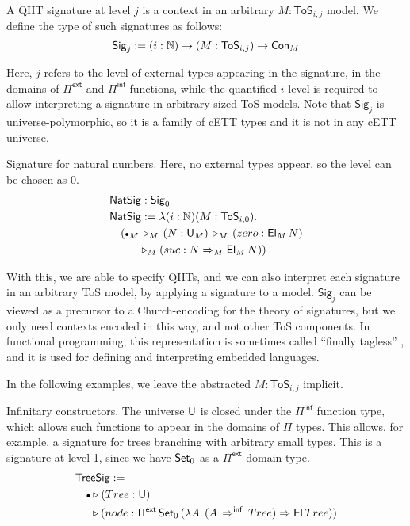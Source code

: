 \documentclass[sigplan,review,anonymous]{acmart}\settopmatter{printfolios=true,printccs=false,printacmref=false}
\newcommand{\ToS}{\mathsf{ToS}}
\newcommand{\ext}{\triangleright}
\newcommand{\emptycon}{\scaleobj{.75}\bullet}
\newcommand{\Pii}{\Pi}
\newcommand{\Pie}{\Pi^{\mathsf{ext}}}
\newcommand{\Piinf}{\Pi^{\mathsf{inf}}}
\newcommand{\Sig}{\mathsf{Sig}}
\newcommand{\NatSig}{\mathsf{NatSig}}
\newcommand{\arri}{\Rightarrow}
\newcommand{\arrinf}{\Rightarrow^{\mathsf{inf}}}
\begin{document}
\begin{definition}\label{def:signature}
A QIIT signature at level $j$ is a context in an arbitrary $M : \ToS_{i,j}$
model. We define the type of such signatures as follows:
\[
  \Sig_j := (i : \mathbb{N})\ra(M : \ToS_{i,j})\ra \Con_M
\]

Here, $j$ refers to the level of external types appearing in the signature, in
the domains of $\Pie$ and $\Piinf$ functions, while the quantified $i$ level is
required to allow interpreting a signature in arbitrary-sized ToS models. Note
that $\Sig_j$ is universe-polymorphic, so it is a family of cETT types and it is
not in any cETT universe.

\begin{example}{
    Signature for natural numbers. Here, no external types appear, so the level
    can be chosen as $0$.}
\begin{alignat*}{3}
  & \NatSig : \Sig_0 \\
  & \NatSig := \lambda (i :\mathbb{N})(M : \ToS_{i,0}).\\
  & \hspace{1em}(\emptycon_M\,\ext_M\, (N : \U_M) \,\ext_M\,(zero : \El_M\,N)\\
  & \hspace{2.67em}\ext_M (suc : N\arri_M\El_M\,N))
\end{alignat*}
\end{example}

With this, we are able to specify QIITs, and we can also interpret each
signature in an arbitrary ToS model, by applying a signature to a model.
$\Sig_j$ can be viewed as a precursor to a Church-encoding for the theory of
signatures, but we only need contexts encoded in this way, and not other ToS
components. In functional programming, this representation is sometimes called
``finally tagless'' \cite{carette2007finally}, and it is used for defining and
interpreting embedded languages.
\end{definition}

In the following examples, we leave the abstracted $M : \ToS_{i,j}$ implicit.

\begin{example}{Infinitary constructors}. The universe $\mathsf{U}$ is closed under
the $\Piinf$ function type, which allows such functions to appear in the domains
of $\Pii$ types. This allows, for example, a signature for trees branching with
arbitrary small types. This is a signature at level 1, since we have $\mathsf{Set}_0$ as
a $\Pie$ domain type.
\begin{alignat*}{3}
& \mathsf{TreeSig} := \\
& \hspace{1em}\emptycon \ext (Tree : \U)\\
& \hspace{1.35em}\ext (node : \Pie\,\Set_0\,(\lambda A.\,(A\,\arrinf\,Tree)\arri\El\,Tree))
\end{alignat*}
\end{example}
\end{document}
